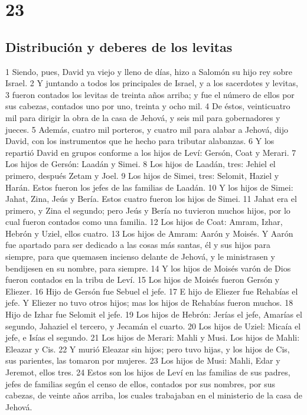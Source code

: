 \chapter{23}

\section*{Distribución y deberes de los levitas}

1 Siendo, pues, David ya viejo y lleno de días, hizo a Salomón su hijo rey sobre Israel. 
2 Y juntando a todos los principales de Israel, y a los sacerdotes y levitas,
3 fueron contados los levitas de treinta años arriba; y fue el número de ellos por sus cabezas, contados uno por uno, treinta y ocho mil.
4 De éstos, veinticuatro mil para dirigir la obra de la casa de Jehová, y seis mil para gobernadores y jueces.
5 Además, cuatro mil porteros, y cuatro mil para alabar a Jehová, dijo David, con los instrumentos que he hecho para tributar alabanzas.
6 Y los repartió David en grupos conforme a los hijos de Leví: Gersón, Coat y Merari.
7 Los hijos de Gersón: Laadán y Simei.
8 Los hijos de Laadán, tres: Jehiel el primero, después Zetam y Joel.
9 Los hijos de Simei, tres: Selomit, Haziel y Harán. Estos fueron los jefes de las familias de Laadán.
10 Y los hijos de Simei: Jahat, Zina, Jeús y Bería. Estos cuatro fueron los hijos de Simei.
11 Jahat era el primero, y Zina el segundo; pero Jeús y Bería no tuvieron muchos hijos, por lo cual fueron contados como una familia.
12 Los hijos de Coat: Amram, Izhar, Hebrón y Uziel, ellos cuatro.
13 Los hijos de Amram: Aarón y Moisés. Y Aarón fue apartado para ser dedicado a las cosas más santas, él y sus hijos para siempre, para que quemasen incienso delante de Jehová, y le ministrasen y bendijesen en su nombre, para siempre. 
14 Y los hijos de Moisés varón de Dios fueron contados en la tribu de Leví.
15 Los hijos de Moisés fueron Gersón y Eliezer.
16 Hijo de Gersón fue Sebuel el jefe.
17 E hijo de Eliezer fue Rehabías el jefe. Y Eliezer no tuvo otros hijos; mas los hijos de Rehabías fueron muchos.
18 Hijo de Izhar fue Selomit el jefe.
19 Los hijos de Hebrón: Jerías el jefe, Amarías el segundo, Jahaziel el tercero, y Jecamán el cuarto.
20 Los hijos de Uziel: Micaía el jefe, e Isías el segundo.
21 Los hijos de Merari: Mahli y Musi. Los hijos de Mahli: Eleazar y Cis.
22 Y murió Eleazar sin hijos; pero tuvo hijas, y los hijos de Cis, sus parientes, las tomaron por mujeres.
23 Los hijos de Musi: Mahli, Edar y Jeremot, ellos tres.
24 Estos son los hijos de Leví en las familias de sus padres, jefes de familias según el censo de ellos, contados por sus nombres, por sus cabezas, de veinte años arriba, los cuales trabajaban en el ministerio de la casa de Jehová.
